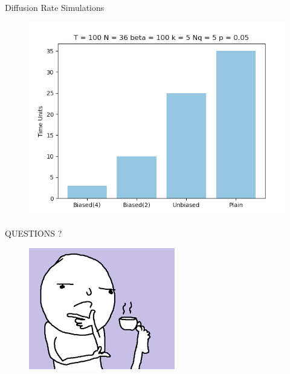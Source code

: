 \documentclass{beamer}
\begin{document}
\begin{frame}{Diffusion Rate Simulations}

\pause
\begin{figure}
        \centering
        \begin{minipage}{1\textwidth}
            \centering
            \includegraphics[width=0.8\linewidth]{simulations.png}
        \end{minipage}%
        
\end{figure}

\end{frame}

\begin{frame}

\begin{center}
\LARGE{QUESTIONS ?}
\end{center}

\begin{figure}
        \centering
        \begin{minipage}{.5\textwidth}
            \centering
            \includegraphics[width=.8\linewidth]{questions.png}
        \end{minipage}%
        
\end{figure}

\end{frame}
\end{document}
